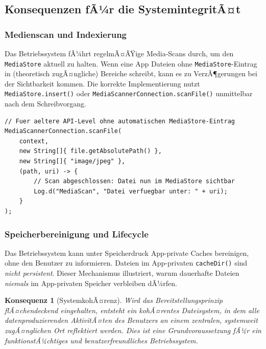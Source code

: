 ﻿\documentclass[12pt, a4paper]{article}
\newtheorem{konsequenz}[definition]{Konsequenz}
\begin{document}
\subsection{Konsequenzen fÃ¼r die SystemintegritÃ¤t}

\subsubsection{Medienscan und Indexierung}

Das Betriebssystem fÃ¼hrt regelmÃ¤ÃŸige Media-Scans durch, um den \texttt{MediaStore}
aktuell zu halten. Wenn eine App Dateien ohne \texttt{MediaStore}-Eintrag in
(theoretisch zugÃ¤ngliche) Bereiche schreibt, kann es zu VerzÃ¶gerungen bei der
Sichtbarkeit kommen. Die korrekte Implementierung nutzt \texttt{MediaStore.insert()}
oder \texttt{MediaScannerConnection.scanFile()} unmittelbar nach dem Schreibvorgang.

\begin{lstlisting}[style=android, caption={Expliziter MediaScan (Fallback, Legacy-Code)}]
// Fuer aeltere API-Level ohne automatischen MediaStore-Eintrag
MediaScannerConnection.scanFile(
    context,
    new String[]{ file.getAbsolutePath() },
    new String[]{ "image/jpeg" },
    (path, uri) -> {
        // Scan abgeschlossen: Datei nun im MediaStore sichtbar
        Log.d("MediaScan", "Datei verfuegbar unter: " + uri);
    }
);
\end{lstlisting}

\subsubsection{Speicherbereinigung und Lifecycle}

Das Betriebssystem kann unter Speicherdruck App-private Caches bereinigen,
ohne den Benutzer zu informieren. Dateien im App-privaten \texttt{cacheDir()} sind
\emph{nicht persistent}. Dieser Mechanismus illustriert, warum dauerhafte Dateien
\emph{niemals} im App-privaten Speicher verbleiben dÃ¼rfen.

\begin{konsequenz}[SystemkohÃ¤renz]
Wird das Bereitstellungsprinzip flÃ¤chendeckend eingehalten, entsteht ein
kohÃ¤rentes Dateisystem, in dem alle datenproduzierenden AktivitÃ¤ten des Benutzers
an einem zentralen, systemweit zugÃ¤nglichen Ort reflektiert werden. Dies ist
eine Grundvoraussetzung fÃ¼r ein funktionstÃ¼chtiges und benutzerfreundliches
Betriebssystem.
\end{konsequenz}
\end{document}
